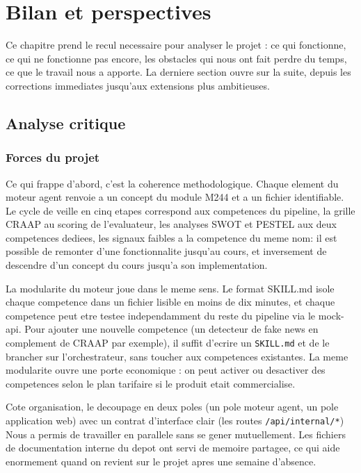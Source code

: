 \documentclass[12pt,a4paper,openany]{report}
\begin{document}
\chapter{Bilan et perspectives}
\label{chap:bilan}

Ce chapitre prend le recul necessaire pour analyser le projet : ce qui fonctionne, ce qui ne fonctionne pas encore, les obstacles qui nous ont fait perdre du temps, ce que le travail nous a apporte. La derniere section ouvre sur la suite, depuis les corrections immediates jusqu'aux extensions plus ambitieuses.

\section{Analyse critique}
\label{sec:analyse-critique}

\subsection{Forces du projet}
\label{sec:forces}

Ce qui frappe d'abord, c'est la coherence methodologique. Chaque element du moteur agent renvoie a un concept du module M244 et a un fichier identifiable. Le cycle de veille en cinq etapes correspond aux competences du pipeline, la grille CRAAP au scoring de l'evaluateur, les analyses SWOT et PESTEL aux deux competences dediees, les signaux faibles a la competence du meme nom: il est possible de remonter d'une fonctionnalite jusqu'au cours, et inversement de descendre d'un concept du cours jusqu'a son implementation.

La modularite du moteur joue dans le meme sens. Le format SKILL.md isole chaque competence dans un fichier lisible en moins de dix minutes, et chaque competence peut etre testee independamment du reste du pipeline via le mock-api. Pour ajouter une nouvelle competence (un detecteur de fake news en complement de CRAAP par exemple), il suffit d'ecrire un \texttt{SKILL.md} et de le brancher sur l'orchestrateur, sans toucher aux competences existantes. La meme modularite ouvre une porte economique : on peut activer ou desactiver des competences selon le plan tarifaire si le produit etait commercialise.

Cote organisation, le decoupage en deux poles (un pole moteur agent, un pole application web) avec un contrat d'interface clair (les routes \texttt{/api/internal/*}) Nous a permis de travailler en parallele sans se gener mutuellement. Les fichiers de documentation interne du depot ont servi de memoire partagee, ce qui aide enormement quand on revient sur le projet apres une semaine d'absence.
\end{document}
